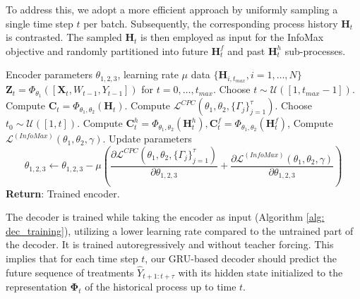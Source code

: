 \documentclass{article}
\theoremstyle{plain}
\theoremstyle{definition}
\theoremstyle{remark}
\begin{document}
To address this, we adopt a more efficient approach by uniformly sampling a single time step $t$ per batch. Subsequently, the corresponding process history $\mathbf{H}_{t}$ is contrasted. The sampled $\mathbf{H}_{t}$ is then employed as input for the InfoMax objective and randomly partitioned into future $\mathbf{H}_t^f$ and past $\mathbf{H}_t^h$ sub-processes.
\begin{algorithm}%
   \caption{Pretraining of the encoder}
   \label{alg: enc_pretraining}
\begin{algorithmic}
   \REQUIRE Encoder parameters $\theta_{1,2,3}$, learning rate $\mu$
    data $\{\mathbf{H}_{i, t_{max}}, i=1,\dots, N \}$ 
                    \STATE $\mathbf{Z}_t = \Phi_{\theta_1}([\mathbf{X}_{t}, W_{t-1}, Y_{t-1}])$ for $t=0, \dots, t_{max}$.
                    \STATE Choose $t \sim \mathcal{U}([1, t_{max}-1])$.
                    \STATE Compute $\mathbf{C}_t = \Phi_{\theta_{1},\theta_{2}}(\mathbf{H}_{t})$.
                    \STATE  Compute $\mathcal{L}^{CPC}(\theta_{1},\theta_{2}, \{\Gamma_j\}_{j=1}^{\tau})$.
                    \STATE  Choose $t_0 \sim \mathcal{U}([1, t])$.
                    \STATE  Compute $\mathbf{C}_t^h=\Phi_{\theta_{1},\theta_{2}}(\mathbf{H}_t^h), \mathbf{C}_t^f=\Phi_{\theta_{1},\theta_{2}}(\mathbf{H}_t^f)$,
                    \STATE Compute $\mathcal{L}^{(InfoMax)}(\theta_{1},\theta_{2}, \gamma)$.
                    \STATE Update parameters
                    $$\theta_{1,2,3} \leftarrow  \theta_{1,2,3} - \mu  \left( \frac{\partial \mathcal{L}^{CPC}(\theta_{1},\theta_{2}, \{\Gamma_j\}_{j=1}^{\tau})}{\partial \theta_{1,2,3} } + \frac{\partial \mathcal{L}^{(InfoMax)}(\theta_{1},\theta_{2}, \gamma)}{\partial \theta_{1,2,3} } \right  ) $$
            \ENDFOR
    \ENDFOR
   \STATE \textbf{Return}: Trained encoder.
\end{algorithmic}
\end{algorithm}

The decoder is trained while taking the encoder as input (Algorithm \ref{alg: dec_training}), utilizing a lower learning rate compared to the untrained part of the decoder. It is trained autoregressively and without teacher forcing. This implies that for each time step $t$, our GRU-based decoder should predict the future sequence of treatments $\hat{Y}_{t+1:t+\tau}$ with its hidden state initialized to the representation $\mathbf{\Phi}_t$ of the historical process up to time $t$.
\end{document}
